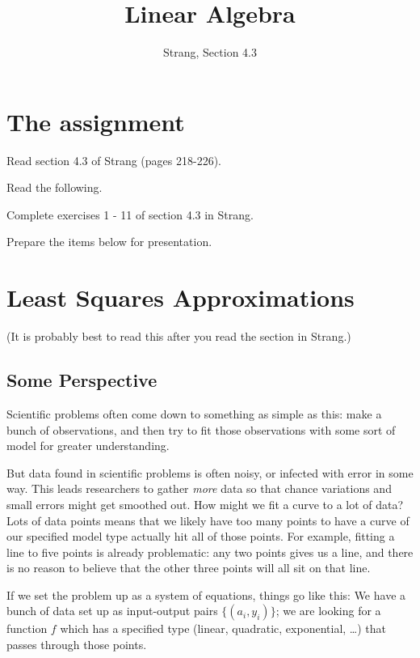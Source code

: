 \documentclass[11pt]{amsart}
\theoremstyle{definition}
\begin{document}
\title{Linear Algebra}
\author{Strang, Section 4.3}
\maketitle

\section{The assignment}
\begin{compactitem}
\item Read section 4.3 of Strang (pages 218-226).
\item Read the following.
\item Complete exercises 1 - 11 of section 4.3 in Strang.
\item Prepare the items below for presentation.
\end{compactitem}


\section{Least Squares Approximations}

(It is probably best to read this after you read the section in Strang.)

\subsection{Some Perspective}

Scientific problems often come down to something as simple as this: make a bunch of observations, and then try to fit those observations with some sort of model for greater understanding.

But data found in scientific problems is often noisy, or infected with error in some way. This leads researchers to gather \emph{more} data so that chance variations and small errors might get smoothed out.  How might we fit a curve to a lot of data? Lots of data points means that we likely have too many points to have a curve of our specified model type actually hit all of those points.
For example, fitting a line to five points is already problematic: any two points gives us a line, and there is no reason to believe that the other three points will all sit on that line.

If we set the problem up as a system of equations, things go like this: We have a bunch of data set up as input-output pairs $\{ (a_i, y_i) \}$; we are looking for a function $f$ which has a specified type (linear, quadratic, exponential, \dots) that passes through those points.
\end{document}
